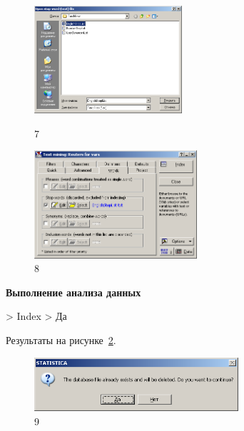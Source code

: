 \begin{figure}[!h]
  \centering

  \begin{minipage}{0.49\textwidth}
    \centering

    \includegraphics[height=4cm]
    {inc/var5/7.PNG}

    \caption{7}

    \label{fig:var5_7}
  \end{minipage}
  \begin{minipage}{0.49\textwidth}
    \centering

    \includegraphics[height=4cm]
    {inc/var5/8.PNG}

    \caption{8}

    \label{fig:var5_8}
  \end{minipage}
\end{figure}

\newpage

\begin{center}
  \textbf{Выполнение анализа данных}
\end{center}

> Index > Да

Результаты на рисунке~\ref{fig:var5_9}.

\begin{figure}[!h]
  \centering

  \includegraphics[height=2cm]
  {inc/var5/9.PNG}

  \caption{9}

  \label{fig:var5_9}
\end{figure}

